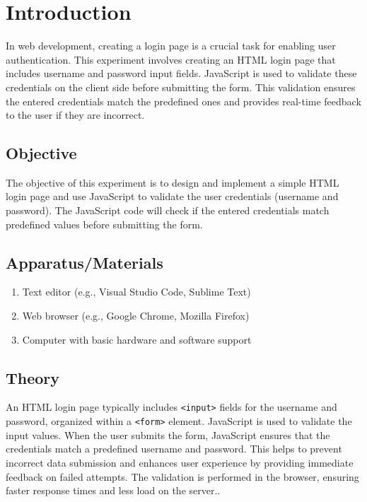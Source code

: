 \documentclass[a4paper,9pt]{article}
\begin{document}
\section*{Introduction}
\setcounter{section}{11}
\setcounter{figure}{0}  %
\setcounter{subsection}{0}

In web development, creating a login page is a crucial task for enabling user authentication. This experiment involves creating an HTML login page that includes username and password input fields. JavaScript is used to validate these credentials on the client side before submitting the form. This validation ensures the entered credentials match the predefined ones and provides real-time feedback to the user if they are incorrect.

\subsection{Objective}
The objective of this experiment is to design and implement a simple HTML login page and use JavaScript to validate the user credentials (username and password). The JavaScript code will check if the entered credentials match predefined values before submitting the form.

\subsection{Apparatus/Materials}
\begin{enumerate}
	\item Text editor (e.g., Visual Studio Code, Sublime Text)
	\item Web browser (e.g., Google Chrome, Mozilla Firefox)
	\item Computer with basic hardware and software support
	
\end{enumerate}
\subsection{Theory}
An HTML login page typically includes \texttt{\textless input\textgreater} fields for the username and password, organized within a \texttt{\textless form\textgreater} element. JavaScript is used to validate the input values. When the user submits the form, JavaScript ensures that the credentials match a predefined username and password. This helps to prevent incorrect data submission and enhances user experience by providing immediate feedback on failed attempts. The validation is performed in the browser, ensuring faster response times and less load on the server..
\end{document}
